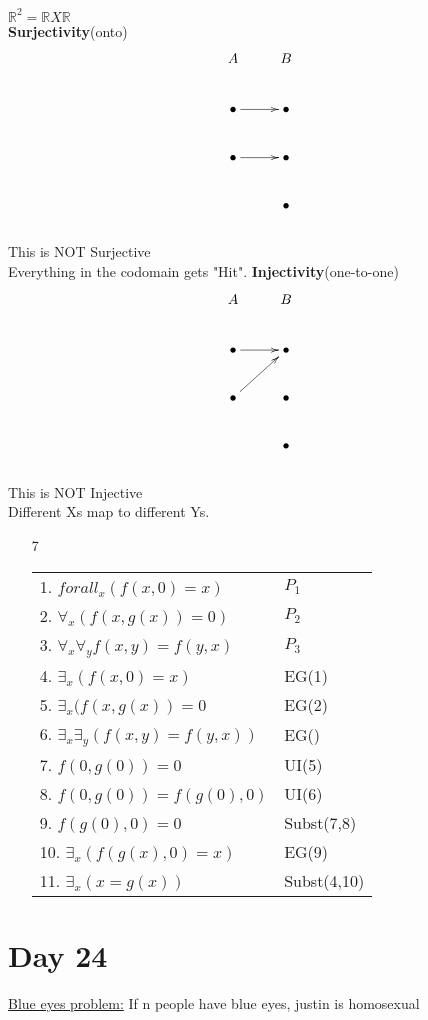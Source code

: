 \documentclass{article}
\begin{document}
	$\mathbb{R}^2 = \mathbb{R} X \mathbb{R}$
	\\
	\textbf{Surjectivity}(onto)\\
	\begin{displaymath}
		\xymatrix{A & B\\
				\bullet \ar[r] & \bullet\\
				\bullet \ar[r] & \bullet\\
				& \bullet}
	\end{displaymath}\\
	This is NOT Surjective\\
	Everything in the codomain gets "Hit".
	\textbf{Injectivity}(one-to-one)\\
	\begin{displaymath}
		\xymatrix{
			A & B\\
			\bullet \ar[r] & \bullet\\
			\bullet \ar[ur] & \bullet\\
			& \bullet\\}
	\end{displaymath}\\
	This is NOT Injective\\
	Different Xs map to different Ys.\\
	\begin{enumerate}
		\item[7]
			\begin{tabular}{l l}
				1. $forall _x (f(x,0)=x)$ & $P_1$\\
				2. $\forall _x (f(x,g(x)) = 0)$ & $P_2$\\
				3. $\forall _x \forall _y f(x,y) = f(y,x)$ & $P_3$\\
				4. $\exists _x (f(x,0) = x)$ & EG(1)\\
				5. $\exists _x (f(x,g(x)) = 0$ & EG(2)\\
				6. $\exists _x \exists _y(f(x,y)=f(y,x))$ & EG()\\
				7. $f(0,g(0)) = 0$ & UI(5)\\
				8. $f(0,g(0)) = f(g(0),0)$ & UI(6)\\
				9. $f(g(0),0) = 0$ & Subst(7,8)\\
				10. $\exists _x (f(g(x),0) = x)$ & EG(9)\\
				11. $\exists _x (x = g(x))$ & Subst(4,10)\\
			\end{tabular}
	\end{enumerate}
	\section{Day 24}
	\underline{Blue eyes problem:} If n people have blue eyes, justin is homosexual	
\end{document}
